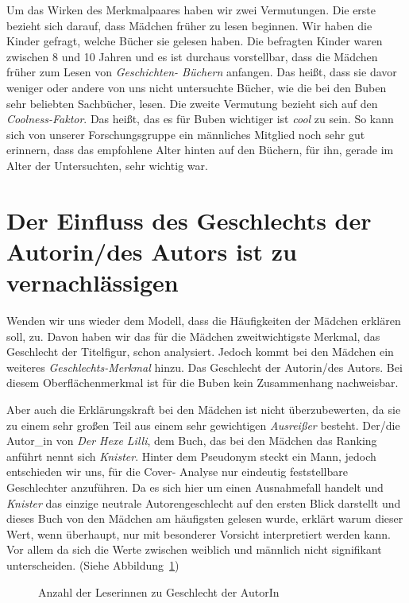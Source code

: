 Um das Wirken des Merkmalpaares haben wir zwei Vermutungen. Die erste
bezieht sich darauf, dass Mädchen früher zu lesen beginnen. Wir haben
die Kinder gefragt, welche Bücher sie gelesen haben. Die befragten
Kinder waren zwischen 8 und 10 Jahren und es ist durchaus vorstellbar,
dass die Mädchen früher zum Lesen von \emph{Geschichten- Büchern}
anfangen. Das heißt, dass sie davor weniger oder andere von uns nicht
untersuchte Bücher, wie die bei den Buben sehr beliebten Sachbücher,
lesen. Die zweite Vermutung bezieht sich auf den \emph{Coolness-Faktor}.
Das heißt, das es für Buben wichtiger ist \emph{cool} zu sein. So kann
sich von unserer Forschungsgruppe ein männliches Mitglied noch sehr gut
erinnern, dass das empfohlene Alter hinten auf den Büchern, für ihn,
gerade im Alter der Untersuchten, sehr wichtig war.

\section{Der Einfluss des Geschlechts der Autorin/des Autors ist zu
vernachlässigen}

Wenden wir uns wieder dem Modell, dass die Häufigkeiten der Mädchen
erklären soll, zu. Davon haben wir das für die Mädchen zweitwichtigste
Merkmal, das Geschlecht der Titelfigur, schon analysiert. Jedoch kommt
bei den Mädchen ein weiteres \emph{Geschlechts-Merkmal} hinzu. Das
Geschlecht der Autorin/des Autors. Bei diesem Oberflächenmerkmal ist für
die Buben kein Zusammenhang nachweisbar.

Aber auch die Erklärungskraft bei den Mädchen ist nicht überzubewerten,
da sie zu einem sehr großen Teil aus einem sehr gewichtigen
\emph{Ausreißer} besteht. Der/die Autor\_in von \emph{Der Hexe Lilli},
dem Buch, das bei den Mädchen das Ranking anführt nennt sich
\emph{Knister}. Hinter dem Pseudonym steckt ein Mann, jedoch entschieden
wir uns, für die Cover- Analyse nur eindeutig feststellbare Geschlechter
anzuführen. Da es sich hier um einen Ausnahmefall handelt und
\emph{Knister} das einzige neutrale Autorengeschlecht auf den ersten
Blick darstellt und dieses Buch von den Mädchen am häufigsten gelesen
wurde, erklärt warum dieser Wert, wenn überhaupt, nur mit besonderer
Vorsicht interpretiert werden kann. Vor allem da sich die Werte zwischen
weiblich und männlich nicht signifikant unterscheiden. (Siehe
Abbildung~\ref{maedchen-geschlecht})

\begin{figure}
\center
  \caption[Leserinnen--Geschlecht]{Anzahl der Leserinnen zu Geschlecht der AutorIn}
  \label{maedchen-geschlecht}


\end{figure}

